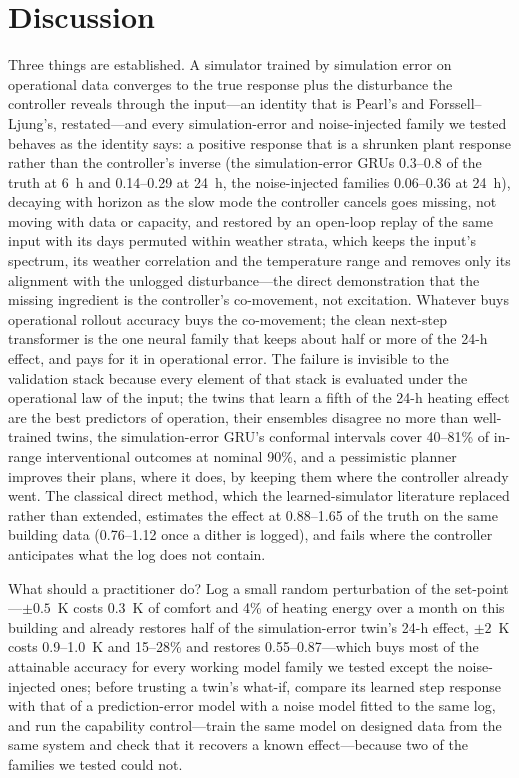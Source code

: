 \documentclass[11pt]{article}
\begin{document}
\section*{Discussion}
Three things are established. A simulator trained by simulation error on operational data converges to the true response plus the disturbance the controller reveals through the input---an identity that is Pearl's \citep{pearl2009} and Forssell--Ljung's, restated---and every simulation-error and noise-injected family we tested behaves as the identity says: a positive response that is a shrunken plant response rather than the controller's inverse (the simulation-error GRUs 0.3--0.8 of the truth at 6~h and 0.14--0.29 at 24~h, the noise-injected families 0.06--0.36 at 24~h), decaying with horizon as the slow mode the controller cancels goes missing, not moving with data or capacity, and restored by an open-loop replay of the same input with its days permuted within weather strata, which keeps the input's spectrum, its weather correlation and the temperature range and removes only its alignment with the unlogged disturbance---the direct demonstration that the missing ingredient is the controller's co-movement, not excitation. Whatever buys operational rollout accuracy buys the co-movement; the clean next-step transformer is the one neural family that keeps about half or more of the 24-h effect, and pays for it in operational error. The failure is invisible to the validation stack because every element of that stack is evaluated under the operational law of the input; the twins that learn a fifth of the 24-h heating effect are the best predictors of operation, their ensembles disagree no more than well-trained twins, the simulation-error GRU's conformal intervals cover 40--81\% of in-range interventional outcomes at nominal 90\%, and a pessimistic planner improves their plans, where it does, by keeping them where the controller already went. The classical direct method, which the learned-simulator literature replaced rather than extended, estimates the effect at 0.88--1.65 of the truth on the same building data (0.76--1.12 once a dither is logged), and fails where the controller anticipates what the log does not contain.

What should a practitioner do? Log a small random perturbation of the set-point---$\pm0.5$~K costs 0.3~K of comfort and 4\% of heating energy over a month on this building and already restores half of the simulation-error twin's 24-h effect, $\pm2$~K costs 0.9--1.0~K and 15--28\% and restores 0.55--0.87---which buys most of the attainable accuracy for every working model family we tested except the noise-injected ones; before trusting a twin's what-if, compare its learned step response with that of a prediction-error model with a noise model fitted to the same log, and run the capability control---train the same model on designed data from the same system and check that it recovers a known effect---because two of the families we tested could not.
\end{document}
